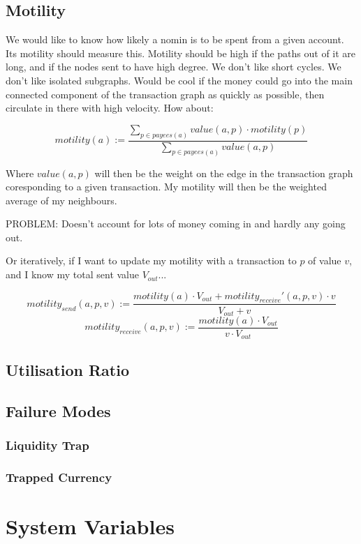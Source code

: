 \documentclass{article}
\begin{document}
\subsection{Motility}
We would like to know how likely a nomin is to be spent from a given account. Its motility should measure this.
Motility should be high if the paths out of it are long, and if the nodes sent to have high degree.
We don't like short cycles. We don't like isolated subgraphs. Would be cool if the money could go into the main
connected component of the transaction graph as quickly as possible, then circulate in there with high velocity. How about:

\[motility(a) := \frac{\sum_{p \in payees(a)}{value(a,p) \cdot motility(p)}}{\sum_{p \in payees(a)}{value(a,p)}} \]

Where \(value(a, p)\) will then be the weight on the edge in the transaction graph coresponding to a given transaction.
My motility will then be the weighted average of my neighbours.

PROBLEM: Doesn't account for lots of money coming in and hardly any going out.

Or iteratively, if I want to update my motility with a transaction to \(p\) of value \(v\), and I know my total sent value \(V_{out}\)...

\[motility_{send}(a, p, v) := \frac{motility(a) \cdot V_{out} + motility_{receive}'(a, p, v) \cdot v}{V_{out} + v} \]
\[motility_{receive}(a, p, v) := \frac{motility(a) \cdot V_{out}}{v \cdot V_{out}}\]




\subsection{Utilisation Ratio}


\subsection{Failure Modes}

\subsubsection{Liquidity Trap}
\subsubsection{Trapped Currency}

\section{System Variables}
\end{document}
